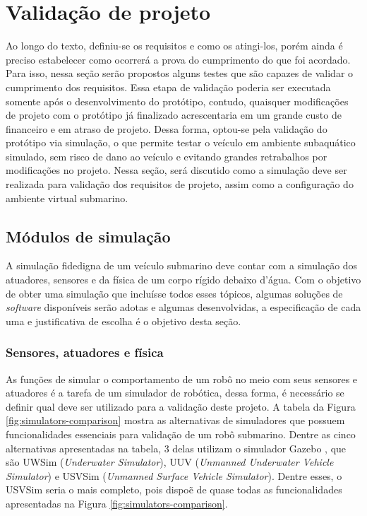 \section{Validação de projeto}
\label{sec:validacao}

Ao longo do texto, definiu-se os requisitos e como os atingi-los, porém ainda é
preciso estabelecer como ocorrerá a prova do cumprimento do que foi acordado.
Para isso, nessa seção serão propostos alguns testes que são capazes de validar
o cumprimento dos requisitos. Essa etapa de validação poderia ser executada
somente após o desenvolvimento do protótipo, contudo, quaisquer modificações
de projeto com o protótipo já finalizado acrescentaria em um grande custo de
financeiro e em atraso de projeto. Dessa forma, optou-se pela validação do
protótipo via simulação, o que permite testar o veículo em ambiente subaquático
simulado, sem risco de dano ao veículo e evitando grandes retrabalhos por
modificações no projeto. Nessa seção, será discutido como a simulação deve ser
realizada para validação dos requisitos de projeto, assim como a configuração do
ambiente virtual submarino.

\subsection{Módulos de simulação}
\label{sec:simu-modules}

A simulação fidedigna de um veículo submarino deve contar com a simulação dos
atuadores, sensores e da física de um corpo rígido debaixo d'água. Com o objetivo de obter uma simulação que incluísse todos esses tópicos, algumas soluções de \textit{software} disponíveis serão adotas e algumas desenvolvidas, a especificação de cada uma e justificativa de escolha é o objetivo desta seção.

\subsubsection*{Sensores, atuadores e física}

As funções de simular o comportamento de um robô no meio com seus sensores e
atuadores é a tarefa de um simulador de robótica, dessa forma, é necessário se
definir qual deve ser utilizado para a validação deste projeto. A tabela da
Figura \ref{fig:simulators-comparison} mostra as alternativas de simuladores
que possuem funcionalidades essenciais para validação de um robô submarino.
Dentre as cinco alternativas apresentadas na tabela, 3 delas utilizam o simulador Gazebo \cite{gazebo}, que são UWSim ({\it Underwater Simulator}), UUV
({\it Unmanned Underwater Vehicle Simulator}) e USVSim ({\it Unmanned Surface
Vehicle Simulator}). Dentre esses, o USVSim seria o mais completo, pois dispoẽ
de quase todas as funcionalidades apresentadas na Figura \ref{fig:simulators-comparison}.

